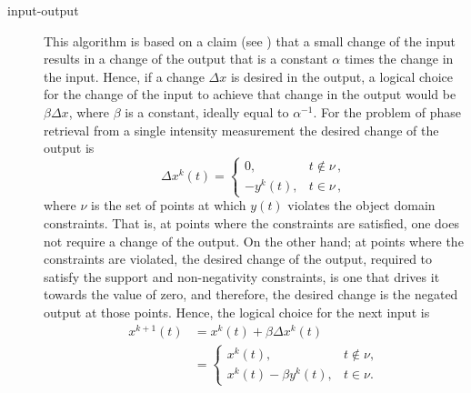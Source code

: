 \begin{description}
\item [{input-output}] This algorithm is based on a claim (see
  ) that a small change of the input results
  in a change of the output that is a constant $\alpha$ times the
  change in the input. Hence, if a change $\Delta x$ is desired in the
  output, a logical choice for the change of the input to achieve that
  change in the output would be $\beta\Delta x$, where $\beta$ is a
  constant, ideally equal to $\alpha^{-1}$. For the problem of phase
  retrieval from a single intensity measurement the desired change of
  the output is
  \begin{equation}
    \label{eq:57}
    \Delta x^{k}(t)=\begin{cases}
      0, & t\not\in\nu \,, \\
      -y^{k}(t), & t\in\nu \,, 
  \end{cases}
  \end{equation}
  where $\nu$ is the set of points at which $y(t)$ violates the object
  domain constraints. That is, at points where the constraints are
  satisfied, one does not require a change of the output. On the other
  hand; at points where the constraints are violated, the desired change of the
  output, required to satisfy the support and non-negativity
  constraints, is one that drives it towards the value of zero, and
  therefore, the desired change is the negated output at those
  points. Hence, the logical choice for the next input is
  \begin{align}
    x^{k+1}(t) & =x^{k}(t)+\beta\Delta x^{k}(t)\nonumber \\
    & =\begin{cases}
      x^{k}(t), & t\not\in\nu,\\
      x^{k}(t)-\beta y^{k}(t), & t\in\nu.
    \end{cases}\label{eq:ioalg}
  \end{align}


\end{description}
